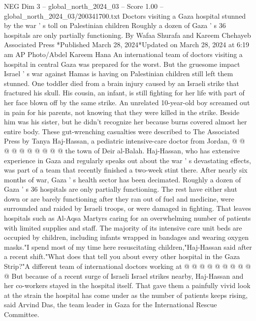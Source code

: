 \begin{textsample}{NEG Dim 3 – global\_north\_2024\_03 – Score 1.00 – global\_north\_2024\_03/200341700.txt}  \label{ex:f3_neg_163}
Doctors visiting a Gaza hospital stunned by the war ' s toll on Palestinian children Roughly a dozen of Gaza ' s 36 hospitals are only partially functioning.
By Wafaa Shurafa and Kareem Chehayeb Associated Press *Published March 28, 2024*Updated on March 28, 2024 at 6:19 am AP Photo/Abdel Kareem Hana An international team of doctors visiting a hospital in central Gaza was prepared for the worst.
But the gruesome impact Israel ' s war against Hamas is having on Palestinian children still left them stunned.
One toddler died from a brain injury caused by an Israeli strike that fractured his skull.
His cousin, an infant, is still fighting for her life with part of her face blown off by the same strike.
An unrelated 10-year-old boy screamed out in pain for his parents, not knowing that they were killed in the strike.
Beside him was his sister, but he didn't recognize her because burns covered almost her entire body.
These gut-wrenching casualties were described to The Associated Press by Tanya Haj-Hassan, a pediatric intensive-care doctor from Jordan, @ @ @ @ @ @ @ @ @ @ the town of Deir al-Balah.
Haj-Hassan, who has extensive experience in Gaza and regularly speaks out about the war ' s devastating effects, was part of a team that recently finished a two-week stint there.
After nearly six months of war, Gaza ' s health sector has been decimated.
Roughly a dozen of Gaza ' s 36 hospitals are only partially functioning.
The rest have either shut down or are barely functioning after they ran out of fuel and medicine, were surrounded and raided by Israeli troops, or were damaged in fighting.
That leaves hospitals such as Al-Aqsa Martyrs caring for an overwhelming number of patients with limited supplies and staff.
The majority of its intensive care unit beds are occupied by children, including infants wrapped in bandages and wearing oxygen masks."I spend most of my time here resuscitating children,"Haj-Hassan said after a recent shift."What does that tell you about every other hospital in the Gaza Strip?"A different team of international doctors working at @ @ @ @ @ @ @ @ @ @ But because of a recent surge of Israeli Israel strikes nearby, Haj-Hassan and her co-workers stayed in the hospital itself.
That gave them a painfully vivid look at the strain the hospital has come under as the number of patients keeps rising, said Arvind Das, the team leader in Gaza for the International Rescue Committee.

\end{textsample}
